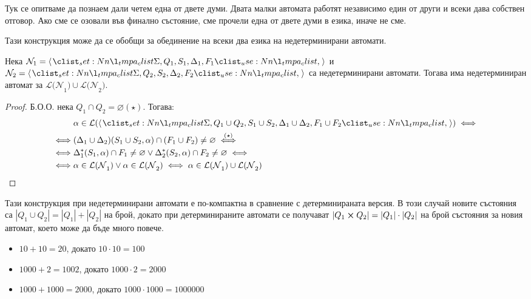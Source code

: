 Тук се опитваме да познаем дали четем една от двете думи.
Двата малки автомата работят независимо един от други и всеки дава собствен отговор.
Ако сме се озовали във финално състояние, сме прочели една от двете думи в езика, иначе не сме.

\pagebreak

Тази конструкция може да се обобщи за обединение на всеки два езика на недетерминирани автомати.

\begin{claim}
    Нека $\mathcal{N}_1 = \opair{\Sigma, Q_1, S_1, \Delta_1, F_1}$ и $\mathcal{N}_2 = \opair{\Sigma, Q_2, S_2, \Delta_2, F_2}$ са недетерминирани автомати.
    Тогава има недетерминиран автомат за $\mathcal{L(N}_1) \cup \mathcal{L(N}_2)$.
\end{claim}

\begin{proof}
    Б.О.О. нека $Q_1 \cap Q_2 = \varnothing (\star)$. Тогава:
    \begin{align*}
             & \alpha \in \mathcal{L}(\opair{\Sigma, Q_1 \cup Q_2, S_1 \cup S_2, \Delta_1 \cup \Delta_2, F_1 \cup F_2}) \iff       \\
        \iff & (\Delta_1 \cup \Delta_2)(S_1 \cup S_2, \alpha) \cap (F_1 \cup F_2) \neq \varnothing \stackrel{(\star)}{\iff}            \\
        \iff & \Delta_1^*(S_1, \alpha) \cap F_1 \neq \varnothing \lor \Delta_2^*(S_2, \alpha) \cap F_2 \neq \varnothing \iff       \\
        \iff & \alpha \in \mathcal{L(N}_1) \lor \alpha \in \mathcal{L(N}_2) \iff \alpha \in \mathcal{L(N}_1) \cup \mathcal{L(N}_2)
    \end{align*}
\end{proof}

Тази конструкция при недетерминирани автомати е по-компактна в сравнение с детерминираната версия.
В този случай новите състояния са $|Q_1 \cup Q_2| = |Q_1| + |Q_2|$ на брой,
докато при детерминираните автомати се получават $|Q_1 \crossproduct Q_2| = |Q_1| \cdot |Q_2|$ на брой състояния за новия автомат, което може да бъде много повече.

\begin{itemize}
    \item $10 + 10 = 20$, докато $10 \cdot 10 = 100$
    \item $1000 + 2 = 1002$, докато $1000 \cdot 2 = 2000$
    \item $1000 + 1000 = 2000$, докато $1000 \cdot 1000 = 1000000$
\end{itemize}
